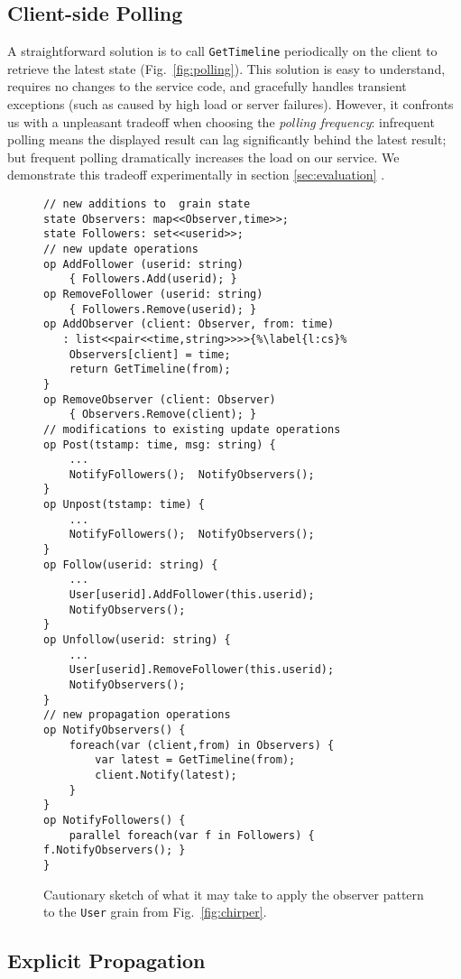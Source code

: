 \subsection{Client-side Polling}\label{sec:polling}

 A straightforward solution is to call \lstinline|GetTimeline| periodically on the client to retrieve the latest state (Fig.~\ref{fig:polling}). This solution is easy to understand, requires no changes to the service code, and gracefully handles transient exceptions (such as caused by high load or server failures). However, it confronts us with a unpleasant tradeoff when choosing the \emph{polling frequency}: infrequent polling means the displayed result can lag significantly behind the latest result; but frequent polling dramatically increases the load on our service. We demonstrate this tradeoff experimentally in section \ref{sec:evaluation} .

\begin{figure}
\begin{lstlisting}
// new additions to  grain state
state Observers: map<<Observer,time>>; 
state Followers: set<<userid>>; 	
// new update operations
op AddFollower (userid: string)
	{ Followers.Add(userid); }
op RemoveFollower (userid: string)
	{ Followers.Remove(userid); }
op AddObserver (client: Observer, from: time)
   : list<<pair<<time,string>>>>{%\label{l:cs}%
 	Observers[client] = time; 
 	return GetTimeline(from);
}
op RemoveObserver (client: Observer)
	{ Observers.Remove(client); }
// modifications to existing update operations
op Post(tstamp: time, msg: string) { 
	...
	NotifyFollowers();  NotifyObservers();
} 
op Unpost(tstamp: time) { 
	...
	NotifyFollowers();  NotifyObservers();
}
op Follow(userid: string) {  
	... 
	User[userid].AddFollower(this.userid);
	NotifyObservers();
}
op Unfollow(userid: string) { 
	...  
	User[userid].RemoveFollower(this.userid);
	NotifyObservers(); 
}
// new propagation operations
op NotifyObservers() {
	foreach(var (client,from) in Observers) {
		var latest = GetTimeline(from);
		client.Notify(latest);
	}
}
op NotifyFollowers() {
	parallel foreach(var f in Followers) { f.NotifyObservers(); }
}
\end{lstlisting}
\caption{Cautionary sketch of what it may take to apply the observer pattern to the \lstinline|User| grain from Fig.~\ref{fig:chirper}.}\label{fig:observers}
\end{figure}

\subsection{Explicit Propagation}\label{sec:observers}

